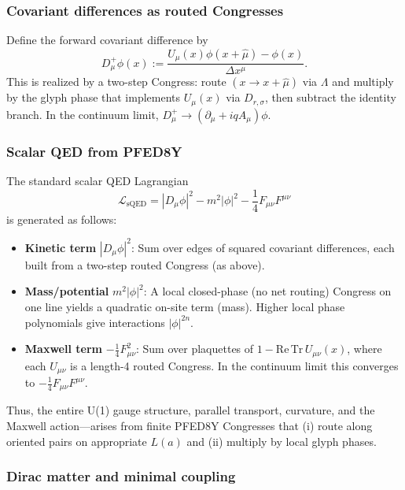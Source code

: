\documentclass[pdflatex,sn-mathphys-num]{sn-jnl}
\theoremstyle{thmstyleone}
\theoremstyle{thmstyletwo}
\theoremstyle{thmstylethree}
\begin{document}
\subsubsection{Covariant differences as routed Congresses}

Define the forward covariant difference by
\begin{equation}
    D_\mu^+ \phi(x) := \frac{U_\mu(x) \phi(x+\hat{\mu}) - \phi(x)}{\Delta x^\mu}.
\end{equation}
This is realized by a two-step Congress: route $(x \to x+\hat{\mu})$ via $\Lambda$ and multiply by the glyph phase that implements $U_\mu(x)$ via $D_{r,\sigma}$, then subtract the identity branch. In the continuum limit, $D_\mu^+ \to (\partial_\mu + iq A_\mu)\phi$.

\subsubsection{Scalar QED from PFED8Y}

The standard scalar QED Lagrangian
\begin{equation}
    \mathcal{L}_{\mathrm{sQED}} = |D_\mu \phi|^2 - m^2 |\phi|^2 - \frac{1}{4} F_{\mu\nu}F^{\mu\nu}
\end{equation}
is generated as follows:
\begin{itemize}
    \item \textbf{Kinetic term} $|D_\mu \phi|^2$: Sum over edges of squared covariant differences, each built from a two-step routed Congress (as above).
    
    \item \textbf{Mass/potential} $m^2|\phi|^2$: A local closed-phase (no net routing) Congress on one line yields a quadratic on-site term (mass). Higher local phase polynomials give interactions $|\phi|^{2n}$.
    
    \item \textbf{Maxwell term} $-\frac{1}{4}F_{\mu\nu}^2$: Sum over plaquettes of $1 - \mathrm{Re}\,\mathrm{Tr}\,U_{\mu\nu}(x)$, where each $U_{\mu\nu}$ is a length-4 routed Congress. In the continuum limit this converges to $-\frac{1}{4}F_{\mu\nu}F^{\mu\nu}$.
\end{itemize}
Thus, the entire U(1) gauge structure, parallel transport, curvature, and the Maxwell action---arises from finite PFED8Y Congresses that (i) route along oriented pairs on appropriate $L(a)$ and (ii) multiply by local glyph phases.

\subsubsection{Dirac matter and minimal coupling}
\end{document}
